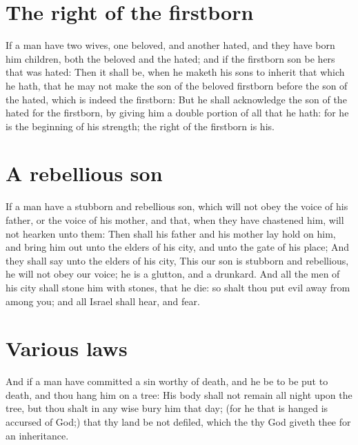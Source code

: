 \begin{biblechapter}
\section*{The right of the firstborn}
\verse If a man have two wives, one beloved, and another hated, and they have born him children, both the beloved and the hated; and if the firstborn son be hers that was hated:
\verse Then it shall be, when he maketh his sons to inherit that which he hath, that he may not make the son of the beloved firstborn before the son of the hated, which is indeed the firstborn:
\verse But he shall acknowledge the son of the hated for the firstborn, by giving him a double portion of all that he hath: for he is the beginning of his strength; the right of the firstborn is his.
\section*{A rebellious son}
\verse If a man have a stubborn and rebellious son, which will not obey the voice of his father, or the voice of his mother, and that, when they have chastened him, will not hearken unto them:
\verse Then shall his father and his mother lay hold on him, and bring him out unto the elders of his city, and unto the gate of his place;
\verse And they shall say unto the elders of his city, This our son is stubborn and rebellious, he will not obey our voice; he is a glutton, and a drunkard.
\verse And all the men of his city shall stone him with stones, that he die: so shalt thou put evil away from among you; and all Israel shall hear, and fear.
\section*{Various laws}
\verse And if a man have committed a sin worthy of death, and he be to be put to death, and thou hang him on a tree:
\verse His body shall not remain all night upon the tree, but thou shalt in any wise bury him that day; (for he that is hanged is accursed of God;) that thy land be not defiled, which the \LORD thy God giveth thee for an inheritance.
\end{biblechapter}

